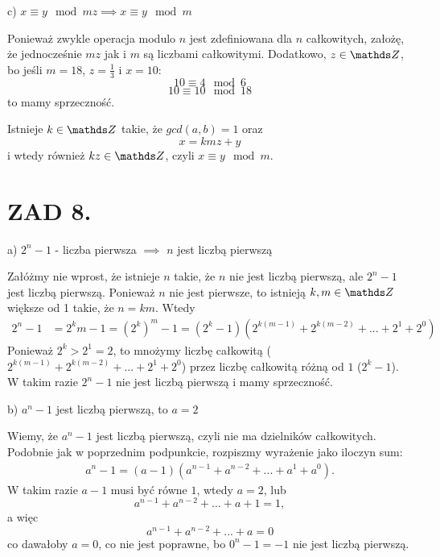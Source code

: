 \documentclass{article}[13pt]
\begin{document}
{\color{def}c) $x\equiv y\mod mz\implies x\equiv y\mod m$}
\medskip

Ponieważ zwykle operacja modulo $n$ jest zdefiniowana dla $n$ całkowitych, założę, że jednocześnie $mz$ jak i $m$ są liczbami całkowitymi. Dodatkowo, $z\in\Z$, bo jeśli $m=18$, $z=\frac13$ i $x=10$:
$$10\equiv 4\mod 6$$
$$10\equiv 10\mod 18$$
to mamy sprzeczność.
\smallskip

Istnieje $k\in\Z$ takie, że $gcd(a,b)=1$ oraz
$$x=kmz+y$$
i wtedy również $kz\in\Z$, czyli $x\equiv y\mod m$.
\smallskip


\section*{ZAD 8.}

{\color{def}a) $2^n-1$ - liczba pierwsza $\implies$ $n$ jest liczbą pierwszą}
\smallskip

Załóżmy nie wprost, że istnieje $n$ takie, że $n$ nie jest liczbą pierwszą, ale $2^n-1$ jest liczbą pierwszą. Ponieważ $n$ nie jest pierwsze, to istnieją $k,m\in\Z$ większe od 1 takie, że $n=km$. Wtedy
\begin{align*}
    2^n-1&=2^km-1=(2^k)^m-1=(2^k-1)(2^{k(m-1)}+2^{k(m-2)}+...+2^1+2^0)
\end{align*}
Ponieważ $2^k>2^1=2$, to mnożymy liczbę całkowitą ($2^{k(m-1)}+2^{k(m-2)}+...+2^1+2^0$) przez liczbę całkowitą różną od $1$ ($2^k-1$). W takim razie $2^n-1$ nie jest liczbą pierwszą i mamy sprzeczność.
\medskip

{\color{def}b) $a^n-1$ jest liczbą pierwszą, to $a=2$}
\smallskip

Wiemy, że $a^n-1$ jest liczbą pierwszą, czyli nie ma dzielników całkowitych. Podobnie jak w poprzednim podpunkcie, rozpiszmy wyrażenie jako iloczyn sum:
\begin{align*}
    a^n-1=(a-1)(a^{n-1}+a^{n-2}+...+a^1+a^0).
\end{align*}
W takim razie $a-1$ musi być równe $1$, wtedy $a=2$, lub
$$a^{n-1}+a^{n-2}+...+a+1=1,$$
a więc
$$a^{n-1}+a^{n-2}+...+a=0$$
co dawałoby $a=0$, co nie jest poprawne, bo $0^n-1=-1$ nie jest liczbą pierwszą.
\medskip
\end{document}
